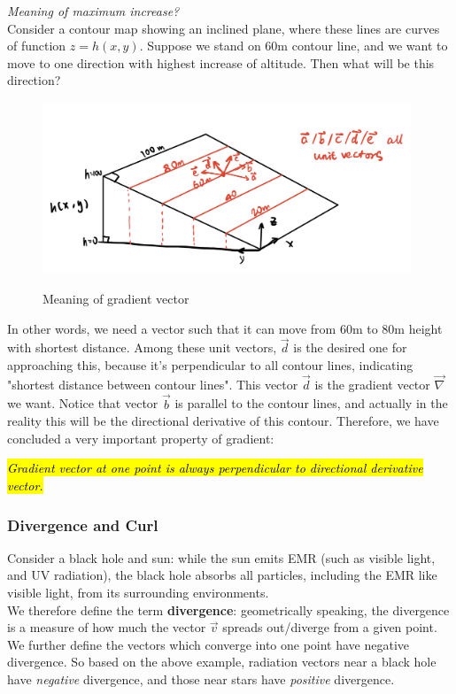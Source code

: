 \documentclass[12pt,a4paper,twoside]{article}
\begin{document}
	\noindent \textit{Meaning of maximum increase?}\\
	\noindent Consider a contour map showing an inclined plane, where these lines are curves of function \(z=h(x,y)\). Suppose we stand on 60m contour line, and we want to move to one direction with highest increase of altitude. Then what will be this direction?
	\begin{figure}[h]
		\centering
		\includegraphics[width=11cm]{gradient_meaning.png}
		\label{fig:1}
		\caption{Meaning of gradient vector}
	\end{figure}
	In other words, we need a vector such that it can move from 60m to 80m height with shortest distance. Among these unit vectors, \(\overrightarrow{d}\) is the desired one for approaching this, because it's perpendicular to all contour lines, indicating "shortest distance between contour lines". This vector \(\overrightarrow{d}\) is the gradient vector \(\overrightarrow{\nabla}\) we want. Notice that vector \(\overrightarrow{b}\) is parallel to the contour lines, and actually in the reality this will be the directional derivative of this contour. Therefore, we have concluded a very important property of gradient:
	\begin{center}
		\textit{\hl{Gradient vector at one point is always perpendicular to directional derivative vector.}}
	\end{center}
	
	\subsubsection{Divergence and Curl}
	Consider a black hole and sun: while the sun emits EMR (such as visible light, and UV radiation), the black hole absorbs all particles, including the EMR like visible light, from its surrounding environments. \\
	
	\noindent We therefore define the term \textbf{divergence}: geometrically speaking, the divergence is a measure of how much the vector $\overrightarrow{v}$ spreads out/diverge from a given point. We further define the vectors which converge into one point have negative divergence. So based on the above example, radiation vectors near a black hole have \textit{negative} divergence, and those near stars have \textit{positive} divergence.\\
	
\end{document}
